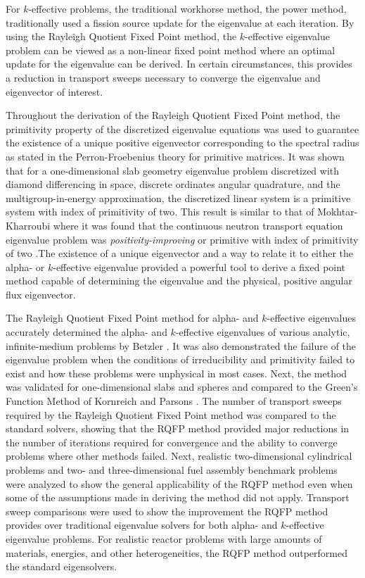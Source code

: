 For $k$-effective problems, the traditional workhorse method, the power method, traditionally used a fission source update for the eigenvalue at each iteration. By using the Rayleigh Quotient Fixed Point method, the $k$-effective eigenvalue problem can be viewed as a non-linear fixed point method where an optimal update for the eigenvalue can be derived. In certain circumstances, this provides a reduction in transport sweeps necessary to converge the eigenvalue and eigenvector of interest.

Throughout the derivation of the Rayleigh Quotient Fixed Point method, the primitivity property of the discretized eigenvalue equations was used to guarantee the existence of a unique positive eigenvector corresponding to the spectral radius as stated in the Perron-Froebenius theory for primitive matrices. It was shown that for a one-dimensional slab geometry eigenvalue problem discretized with diamond differencing in space, discrete ordinates angular quadrature, and the multigroup-in-energy approximation, the discretized linear system is a primitive system with index of primitivity of two. This result is similar to that of Mokhtar-Kharroubi where it was found that the continuous neutron transport equation eigenvalue problem was \textit{positivity-improving} or primitive with index of primitivity of two \cite{mokhtar1997mathematical}.The existence of a unique eigenvector and a way to relate it to either the alpha- or $k$-effective eigenvalue provided a powerful tool to derive a fixed point method capable of determining the eigenvalue and the physical, positive angular flux eigenvector.

The Rayleigh Quotient Fixed Point method for alpha- and $k$-effective eigenvalues accurately determined the alpha- and $k$-effective eigenvalues of various analytic, infinite-medium problems by Betzler \cite{Betzler2014Alpha}. It was also demonstrated the failure of the eigenvalue problem when the conditions of irreducibility and primitivity failed to exist and how these problems were unphysical in most cases. Next, the method was validated for one-dimensional slabs and spheres and compared to the Green's Function Method of Kornreich and Parsons \cite{kornreich_timeeigenvalue_2005}. The number of transport sweeps required by the Rayleigh Quotient Fixed Point method was compared to the standard solvers, showing that the RQFP method provided major reductions in the number of iterations required for convergence and the ability to converge problems where other methods failed. Next, realistic two-dimensional cylindrical problems and two- and three-dimensional fuel assembly benchmark problems were analyzed to show the general applicability of the RQFP method even when some of the assumptions made in deriving the method did not apply. Transport sweep comparisons were used to show the improvement the RQFP method provides over traditional eigenvalue solvers for both alpha- and $k$-effective eigenvalue problems. For realistic reactor problems with large amounts of materials, energies, and other heterogeneities, the RQFP method outperformed the standard eigensolvers.

